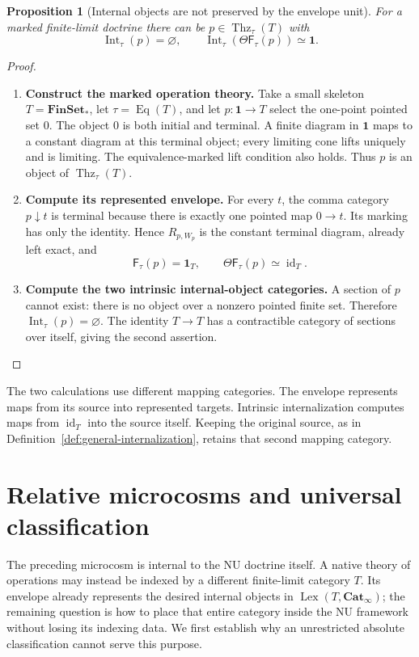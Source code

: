 \documentclass[oneside]{article}
\theoremstyle{plain}
\newtheorem{proposition}[theorem]{Proposition}
\theoremstyle{definition}
\theoremstyle{remark}
\newcommand{\Cat}{\mathbf{Cat}_{\infty}}
\newcommand{\Eq}{\operatorname{Eq}}
\newcommand{\Int}{\operatorname{Int}}
\newcommand{\Lex}{\operatorname{Lex}}
\newcommand{\Thz}{\operatorname{Thz}}
\newcommand{\id}{\operatorname{id}}
\newcommand{\one}{\mathbf 1}
\begin{document}
\begin{proposition}[Internal objects are not preserved by the envelope unit]
\label{prop:envelope-internal-object-obstruction}
For a marked finite-limit doctrine there can be
$p\in\Thz_\tau(T)$ with
\[
 \Int_\tau(p)=\varnothing,
 \qquad
 \Int_\tau(\Theta\mathsf F_\tau(p))\simeq\one.
\]
\end{proposition}
\begin{proof}
\leavevmode
\begin{enumerate}
\item \textbf{Construct the marked operation theory.}
Take a small skeleton $T=\mathbf{FinSet}_*$, let
$\tau=\Eq(T)$, and let $p:\one\to T$ select the one-point pointed
set $0$. The object $0$ is both initial and terminal. A finite diagram
in $\one$ maps to a constant diagram at this terminal object; every
limiting cone lifts uniquely and is limiting. The equivalence-marked
lift condition also holds. Thus $p$ is an object of $\Thz_\tau(T)$.


\item \textbf{Compute its represented envelope.}
For every $t$, the comma category $p\downarrow t$ is terminal because
there is exactly one pointed map $0\to t$. Its marking has only the
identity. Hence $R_{p,W_p}$ is the constant terminal diagram, already
left exact, and
\[
 \mathsf F_\tau(p)=\one_T,
 \qquad \Theta\mathsf F_\tau(p)\simeq\id_T.
\]

\item \textbf{Compute the two intrinsic internal-object categories.}
A section of $p$ cannot exist: there is no object over a nonzero
pointed finite set. Therefore $\Int_\tau(p)=\varnothing$.
The identity $T\to T$ has a contractible category of sections over
itself, giving the second assertion.
\qedhere
\end{enumerate}
\end{proof}

The two calculations use different mapping categories. The envelope
represents maps from its source into represented targets. Intrinsic
internalization computes maps from $\id_T$ into the source itself.
Keeping the original source, as in
Definition~\ref{def:general-internalization}, retains that second
mapping category.

\section{Relative microcosms and universal classification}\label{sec:relative}
The preceding microcosm is internal to the NU doctrine itself. A native
theory of operations may instead be indexed by a different finite-limit
category $T$. Its envelope already represents the desired internal
objects in $\Lex(T,\Cat)$; the remaining question is how to place that
entire category inside the NU framework without losing its indexing data.
We first establish why an unrestricted absolute classification cannot
serve this purpose.
\end{document}
